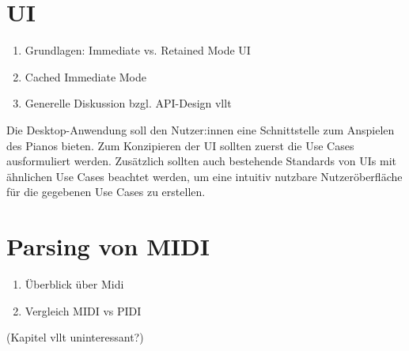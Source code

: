 \section{UI} \label{vorgehenSW-UI}
\begin{enumerate}
    \item Grundlagen: Immediate vs. Retained Mode UI
    \item Cached Immediate Mode
    \item Generelle Diskussion bzgl. API-Design vllt
\end{enumerate}

Die Desktop-Anwendung soll den Nutzer:innen eine Schnittstelle zum Anspielen des Pianos bieten.
Zum Konzipieren der \ac{UI} sollten zuerst die Use Cases ausformuliert werden.
Zusätzlich sollten auch bestehende Standards von \ac{UI}s mit ähnlichen Use Cases beachtet werden, um eine intuitiv nutzbare Nutzeröberfläche für die gegebenen Use Cases zu erstellen.


\section{Parsing von \ac{MIDI}} \label{vorgehenSW-MIDI}
\begin{enumerate}
    \item Überblick über Midi
    \item Vergleich \ac{MIDI} vs PIDI
\end{enumerate}
(Kapitel vllt uninteressant?)